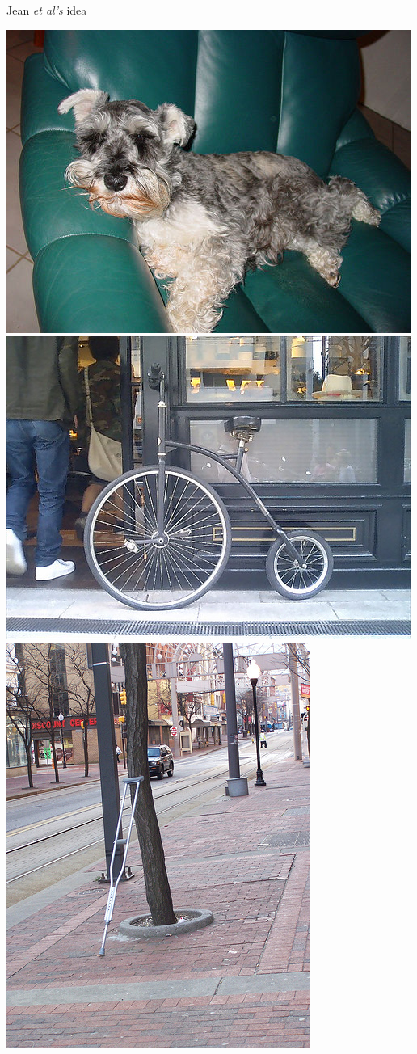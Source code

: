 \documentclass[mathserif]{beamer}
\begin{document}
\begin{frame}{Jean \textit{et al's} idea}
\begin{enumerate}
\begin{itemize}
\includegraphics[height=0.3\textheight]{schnauzer} \;\includegraphics[height=0.3\textheight]{boneshaker}\;\includegraphics[height=0.3\textheight]{crutch.jpg}


\end{itemize}
\end{enumerate}
\end{frame}
\end{document}
